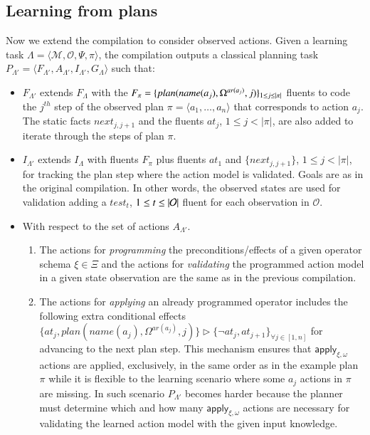 \documentclass[3p,times]{elsarticle}
\newcommand{\tup}[1]{{\langle #1 \rangle}}
\begin{document}
\subsection{Learning from plans}
Now we extend the compilation to consider observed actions. Given a learning task $\Lambda=\tup{\mathcal{M},\mathcal{O},\Psi,\pi}$, the compilation outputs a classical planning task $P_{\Lambda'}=\tup{F_{\Lambda'},A_{\Lambda'},I_{\Lambda'},G_{\Lambda}}$ such that:
\begin{itemize}
\item $F_{\Lambda'}$ extends $F_{\Lambda}$ with the $F_{\pi}=\{plan(name(a_j),\Omega^{ar(a_j)},j)\}_{\small 1\leq j\leq |\pi|}$ fluents to code the $j^{th}$ step of the observed plan $\pi=\tup{a_1, \ldots, a_n}$ that corresponds to action $a_j$. The static facts $next_{j,j+1}$ and the fluents $at_j$, {\small $1\leq j< |\pi|$}, are also added to iterate through the steps of plan $\pi$.
\item $I_{\Lambda'}$ extends $I_{\Lambda}$ with fluents $F_{\pi}$ plus fluents $at_1$ and $\{next_{j,j+1}\}$, {\small $1\leq j<|\pi|$}, for tracking the plan step where the action model is validated. Goals are as in the original compilation. In other words, the observed states are used for validation adding a $test_t$, ${\small 1\leq t\leq |\mathcal{O}|}$ fluent for each observation in $\mathcal{O}$.
\item With respect to the set of actions $A_{\Lambda'}$.
\begin{enumerate}
\item The actions for {\em programming} the preconditions/effects of a given operator schema $\xi\in\Xi$ and the actions for {\em validating} the programmed action model in a given state observation are the same as in the previous compilation.
\item The actions for {\em applying} an already programmed operator includes the following extra conditional effects $\{at_{j},plan(name(a_j),\Omega^{ar(a_j)},j)\}\rhd\{\neg at_{j},at_{j+1}\}_{\forall j\in [1,n]}$ for advancing to the next plan step. This mechanism ensures that $\mathsf{apply_{\xi,\omega}}$ actions are applied, exclusively, in the same order as in the example plan $\pi$ while it is flexible to the learning scenario where some $a_j$ actions in $\pi$ are missing. In such scenario $P_{\Lambda'}$ becomes harder because the planner must determine which and how many $\mathsf{apply_{\xi,\omega}}$ actions are necessary for validating the learned action model with the given input knowledge.
\end{enumerate}
\end{itemize}
\end{document}
